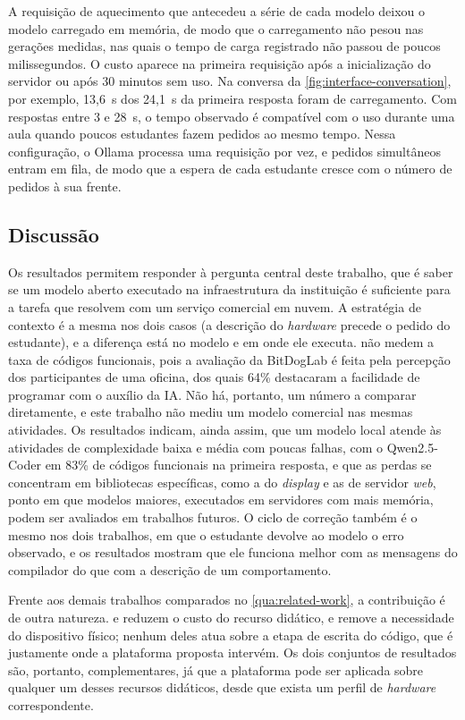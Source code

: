 A requisição de aquecimento que antecedeu a série de cada modelo deixou o modelo carregado em memória, de modo que o carregamento não pesou nas gerações medidas, nas quais o tempo de carga registrado não passou de poucos milissegundos. O custo aparece na primeira requisição após a inicialização do servidor ou após 30 minutos sem uso. Na conversa da \autoref{fig:interface-conversation}, por exemplo, 13,6~s dos 24,1~s da primeira resposta foram de carregamento. Com respostas entre 3 e 28~s, o tempo observado é compatível com o uso durante uma aula quando poucos estudantes fazem pedidos ao mesmo tempo. Nessa configuração, o Ollama processa uma requisição por vez, e pedidos simultâneos entram em fila, de modo que a espera de cada estudante cresce com o número de pedidos à sua frente.

\subsection{Discussão}
\label{subsec:results-discussion}

Os resultados permitem responder à pergunta central deste trabalho, que é saber se um modelo aberto executado na infraestrutura da instituição é suficiente para a tarefa que  resolvem com um serviço comercial em nuvem. A estratégia de contexto é a mesma nos dois casos (a descrição do \textit{hardware} precede o pedido do estudante), e a diferença está no modelo e em onde ele executa.  não medem a taxa de códigos funcionais, pois a avaliação da BitDogLab é feita pela percepção dos participantes de uma oficina, dos quais 64\% destacaram a facilidade de programar com o auxílio da IA. Não há, portanto, um número a comparar diretamente, e este trabalho não mediu um modelo comercial nas mesmas atividades. Os resultados indicam, ainda assim, que um modelo local atende às atividades de complexidade baixa e média com poucas falhas, com o Qwen2.5-Coder em 83\% de códigos funcionais na primeira resposta, e que as perdas se concentram em bibliotecas específicas, como a do \textit{display} e as de servidor \textit{web}, ponto em que modelos maiores, executados em servidores com mais memória, podem ser avaliados em trabalhos futuros. O ciclo de correção também é o mesmo nos dois trabalhos, em que o estudante devolve ao modelo o erro observado, e os resultados mostram que ele funciona melhor com as mensagens do compilador do que com a descrição de um comportamento.

Frente aos demais trabalhos comparados no \autoref{qua:related-work}, a contribuição é de outra natureza.  e  reduzem o custo do recurso didático, e  remove a necessidade do dispositivo físico; nenhum deles atua sobre a etapa de escrita do código, que é justamente onde a plataforma proposta intervém. Os dois conjuntos de resultados são, portanto, complementares, já que a plataforma pode ser aplicada sobre qualquer um desses recursos didáticos, desde que exista um perfil de \textit{hardware} correspondente.

